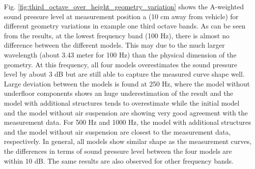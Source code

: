 Fig. \ref{fig:third_octave_over_height_geometry_variation} shows the A-weighted sound pressure level at measurement position a (10 cm away from vehicle) for different geometry variations in example one third octave bands. As can be seen from the results, at the lowest frequency band (100 Hz), there is almost no difference between the different models. This may due to the much larger wavelength (about 3.43 meter for 100 Hz) than the physical dimension of the geometry. At this frequency, all four models overestimates the sound pressure level by about 3 dB but are still able to capture the measured curve shape well. Large deviation between the models is found at 250 Hz, where the model without underfloor components shows an huge underestimation of the result and the model with additional structures tends to overestimate while the initial model and the model without air suspension are showing very good agreement with the measurement data. For 500 Hz and 1000 Hz, the model with additional structures and the model without air suspension are closest to the measurement data, respectively. In general, all models show similar shape as the measurement curves, the differences in terms of sound pressure level between the four models are within 10 dB. The same results are also observed for other frequency bands.

